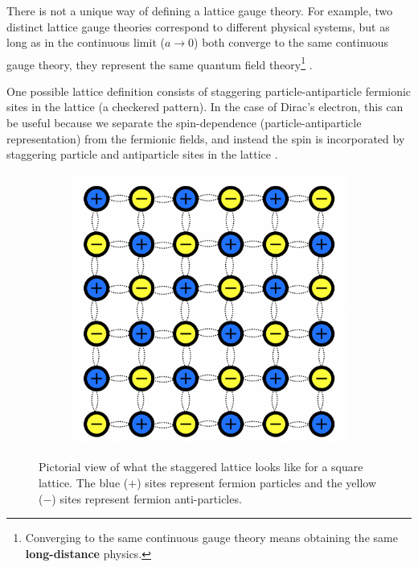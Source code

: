 \documentclass[a4paper]{report}
\begin{document}
\begin{spacing}{1.1}
There is not a unique way of defining a lattice gauge theory. For example, two distinct lattice gauge theories correspond to different physical systems, but as long as in the continuous limit ($a\xrightarrow[]{}0$) both converge to the same continuous gauge theory, they represent the same quantum field theory\footnote{Converging to the same continuous gauge theory means obtaining the same \textbf{long-distance} physics.} \cite{wiese2013ultracold,dalmonte2016lattice}.

One possible lattice definition consists of staggering particle-antiparticle fermionic sites in the lattice (a checkered pattern). In the case of Dirac's electron, this can be useful because we separate the spin-dependence (particle-antiparticle representation) from the fermionic fields, and instead the spin is incorporated by staggering particle and antiparticle sites in the lattice \cite{wiese2013ultracold}.


\begin{figure}[h!]
\centering
\begin{subfigure}{0.4\textwidth}
\includegraphics[width=\linewidth]{StaggeredLat.png} %
\end{subfigure}
\caption{Pictorial view of what the staggered lattice looks like for a square lattice. The blue ($+$) sites represent fermion particles and the yellow ($-$) sites represent fermion anti-particles.}
\end{figure}



\end{spacing}
\end{document}

